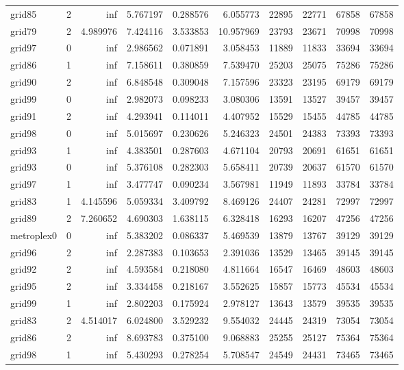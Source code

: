 \begin{longtable}{|l|r|r|r|r|r|r|r|r|r|}
grid85 & 2 & inf & 5.767197 & 0.288576 & 6.055773 & 22895 & 22771 & 67858 & 67858 \\
grid79 & 2 & 4.989976 & 7.424116 & 3.533853 & 10.957969 & 23793 & 23671 & 70998 & 70998 \\
grid97 & 0 & inf & 2.986562 & 0.071891 & 3.058453 & 11889 & 11833 & 33694 & 33694 \\
grid86 & 1 & inf & 7.158611 & 0.380859 & 7.539470 & 25203 & 25075 & 75286 & 75286 \\
grid90 & 2 & inf & 6.848548 & 0.309048 & 7.157596 & 23323 & 23195 & 69179 & 69179 \\
grid99 & 0 & inf & 2.982073 & 0.098233 & 3.080306 & 13591 & 13527 & 39457 & 39457 \\
grid91 & 2 & inf & 4.293941 & 0.114011 & 4.407952 & 15529 & 15455 & 44785 & 44785 \\
grid98 & 0 & inf & 5.015697 & 0.230626 & 5.246323 & 24501 & 24383 & 73393 & 73393 \\
grid93 & 1 & inf & 4.383501 & 0.287603 & 4.671104 & 20793 & 20691 & 61651 & 61651 \\
grid93 & 0 & inf & 5.376108 & 0.282303 & 5.658411 & 20739 & 20637 & 61570 & 61570 \\
grid97 & 1 & inf & 3.477747 & 0.090234 & 3.567981 & 11949 & 11893 & 33784 & 33784 \\
grid83 & 1 & 4.145596 & 5.059334 & 3.409792 & 8.469126 & 24407 & 24281 & 72997 & 72997 \\
grid89 & 2 & 7.260652 & 4.690303 & 1.638115 & 6.328418 & 16293 & 16207 & 47256 & 47256 \\
metroplex0 & 0 & inf & 5.383202 & 0.086337 & 5.469539 & 13879 & 13767 & 39129 & 39129 \\
grid96 & 2 & inf & 2.287383 & 0.103653 & 2.391036 & 13529 & 13465 & 39145 & 39145 \\
grid92 & 2 & inf & 4.593584 & 0.218080 & 4.811664 & 16547 & 16469 & 48603 & 48603 \\
grid95 & 2 & inf & 3.334458 & 0.218167 & 3.552625 & 15857 & 15773 & 45534 & 45534 \\
grid99 & 1 & inf & 2.802203 & 0.175924 & 2.978127 & 13643 & 13579 & 39535 & 39535 \\
grid83 & 2 & 4.514017 & 6.024800 & 3.529232 & 9.554032 & 24445 & 24319 & 73054 & 73054 \\
grid86 & 2 & inf & 8.693783 & 0.375100 & 9.068883 & 25255 & 25127 & 75364 & 75364 \\
grid98 & 1 & inf & 5.430293 & 0.278254 & 5.708547 & 24549 & 24431 & 73465 & 73465 \\

\end{longtable}

